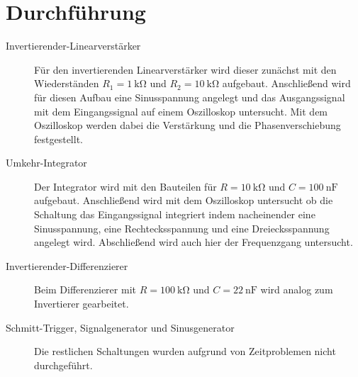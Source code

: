 \newpage
\section{Durchführung}
\label{sec:Durchfuehrung}
\begin{description}
    \item[Invertierender-Linearverstärker] Für den invertierenden Linearverstärker wird dieser zunächst mit den Wiederständen $R_1 = \SI{1}{\kilo \ohm}$ und $R_2 = \SI{10}{\kilo \ohm}$ aufgebaut. Anschließend wird für diesen Aufbau eine Sinusspannung angelegt und das Ausgangssignal mit dem Eingangssignal auf einem Oszilloskop untersucht. Mit dem Oszilloskop werden dabei die Verstärkung und die Phasenverschiebung festgestellt.
    \item[Umkehr-Integrator] Der Integrator wird mit den Bauteilen für $R = \SI{10}{\kilo \ohm}$ und $C = \SI{100}{\nano\farad}$ aufgebaut. Anschließend wird mit dem Oszilloskop untersucht ob die Schaltung das Eingangssignal integriert indem nacheinender eine Sinusspannung, eine Rechtecksspannung und eine Dreiecksspannung angelegt wird. Abschließend wird auch hier der Frequenzgang untersucht. 
    \item[Invertierender-Differenzierer] Beim Differenzierer mit $R = \SI{100}{\kilo \ohm}$ und $C = \SI{22}{\nano\farad}$ wird analog zum Invertierer gearbeitet.
    \item[Schmitt-Trigger, Signalgenerator und Sinusgenerator] Die restlichen Schaltungen wurden aufgrund von Zeitproblemen nicht durchgeführt.
\end{description}